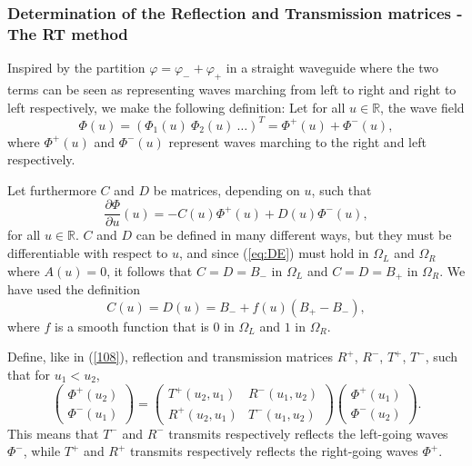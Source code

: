 \documentclass{svjour3}
\renewcommand{\phi}{\varphi}
\renewcommand{\Phi}{\varPhi}
\renewcommand{\vec}[1]{\bm{#1}}
\newcommand{\R}{\mathbb R}
\renewcommand{\Phi}{\varPhi}
\begin{document}
\subsubsection{Determination of the Reflection and Transmission
  matrices - The RT method}
\label{sec:RT}

Inspired by the partition $\phi=\phi_-+\phi_+$ in a straight waveguide
where the two terms can be seen as representing waves marching from
left to right and right to left respectively, we make the following
definition: Let for all $u\in\R$, the wave field
\begin{equation}
  \label{eq:Phipart1}
  \vec\Phi(u)=(\Phi_1(u)\ \Phi_2(u)\ \dots)^T
  =\vec\Phi^+(u)+\vec\Phi^-(u),
\end{equation}
where $\vec\Phi^+(u)$ and $\vec\Phi^-(u)$ represent waves marching to
the right and left respectively.

Let furthermore $C$ and $D$ be matrices, depending on $u$, such that
\begin{equation}
  \label{eq:plusminustodiff}
  \dfrac{\partial\vec\Phi}{\partial u}(u)=
  -C(u)\vec\Phi^+(u)+D(u)\vec\Phi^-(u),
\end{equation}
for all $u\in\R$. $C$ and $D$ can be defined in many different ways,
but they must be differentiable with respect to $u$, and since
(\ref{eq:DE}) must hold in $\Omega_L$ and $\Omega_R$ where $A(u)=0$,
it follows that $C=D=B_-$ in $\Omega_L$ and $C=D=B_+$ in
$\Omega_R$. We have used the definition
\begin{equation}
  \label{eq:CD}
  C(u)=D(u)=B_-+f(u)(B_+-B_-),
\end{equation}
where $f$ is a smooth function that is $0$ in $\Omega_L$ and $1$ in
$\Omega_R$.

Define, like in (\ref{108}), reflection and transmission matrices
$R^+$, $R^-$, $T^+$, $T^-$, such that for $u_1<u_2$,
\begin{equation}
  \label{eq:RT}
  \begin{pmatrix}
    \vec\Phi^+(u_2)\\
    \vec\Phi^-(u_1)
  \end{pmatrix}=
  \begin{pmatrix}
    T^+(u_2,u_1)&R^-(u_1,u_2)\\
    R^+(u_2,u_1)&T^-(u_1,u_2)
  \end{pmatrix}
  \begin{pmatrix}
    \vec\Phi^+(u_1)\\
    \vec\Phi^-(u_2)
  \end{pmatrix}.
\end{equation}
This means that $T^-$ and $R^-$ transmits respectively reflects the
left-going waves $\vec\Phi^-$, while $T^+$ and $R^+$ transmits
respectively reflects the right-going waves $\vec\Phi^+$.
\end{document}
